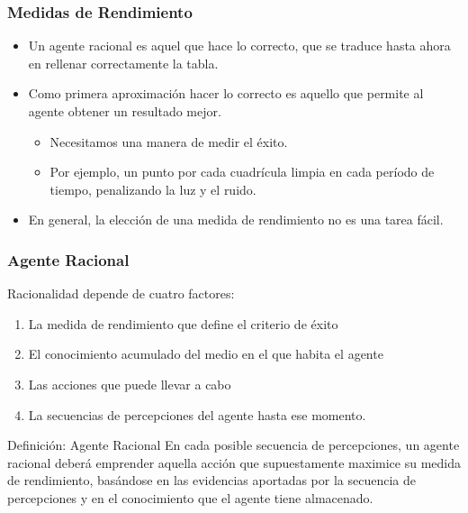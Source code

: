 \documentclass{beamer}
\begin{document}
\begin{frame}\frametitle{Medidas de Rendimiento} \footnotesize  
 
\begin{itemize}
\item Un agente racional es aquel que hace lo correcto, que se  traduce hasta ahora en rellenar correctamente la tabla.
\item Como primera aproximación hacer lo correcto es aquello que permite al agente obtener un resultado mejor.
\begin{itemize}
\item Necesitamos una manera de medir el éxito.
\item Por ejemplo, un punto por cada cuadrícula limpia en cada período de tiempo, penalizando la luz y el ruido.
\end{itemize}
\item En general, la elección de una medida de rendimiento no es una tarea fácil.

\end{itemize}

\end{frame}

\begin{frame}\frametitle{Agente Racional} \footnotesize  
 
 
 Racionalidad depende de cuatro factores:

\begin{enumerate}
 \item  La medida de rendimiento que define el criterio de éxito 
  \item  El conocimiento acumulado del medio en el que habita el agente 
  \item  Las acciones que puede llevar a cabo
  \item  La secuencias de percepciones del agente hasta ese momento.

 \end{enumerate} 
 
 \vspace*{0,8cm}
 \begin{block}{Definición: Agente Racional}
En cada posible secuencia de percepciones, un agente racional deberá emprender aquella acción que supuestamente maximice su medida de rendimiento, basándose en las evidencias aportadas por la secuencia de percepciones y en el conocimiento que el agente tiene almacenado.
\end{block}

\end{frame}
\end{document}
